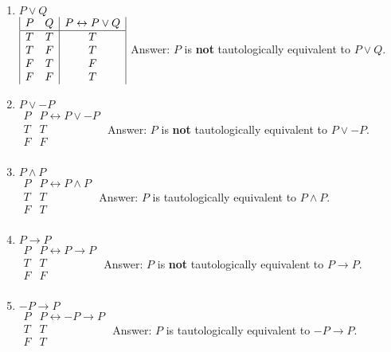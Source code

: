 \documentclass{article}
\begin{document}
\begin{enumerate}[label=(\alph*)]

\item \(P \lor Q\)\\
\(
\begin{array}{|c c|c|}
P & Q & P \leftrightarrow P \lor Q\\ 
\hline
T & T & T\\
T & F & T\\
F & T & F\\
F & F & T\\
\end{array}
\)
\singlespace
Answer: \(P\) is \textbf{not} tautologically equivalent to \(P \lor Q\).\\
\medskip

\item \(P \lor -P\)\\
\(
\begin{array}{|c|c|}
P & P \leftrightarrow P \lor -P\\ 
\hline
T & T\\
F & F\\
\end{array}
\)
\singlespace
Answer: \(P\) is \textbf{not} tautologically equivalent to \(P \lor -P\).\\
\medskip

\item \(P \land P\)\\
\(
\begin{array}{|c|c|}
P & P \leftrightarrow P \land P\\ 
\hline
T & T\\
F & T\\
\end{array}
\)
\singlespace
Answer: \(P\) is tautologically equivalent to \(P \land P\).\\
\medskip

\item \(P \rightarrow P\)\\
\(
\begin{array}{|c|c|}
P & P \leftrightarrow P \rightarrow P\\ 
\hline
T & T\\
F & F\\
\end{array}
\)
\singlespace
Answer: \(P\) is \textbf{not} tautologically equivalent to \(P \rightarrow P\).\\
\medskip

\item \(-P \rightarrow P\)\\
\(
\begin{array}{|c|c|}
P & P \leftrightarrow -P \rightarrow P\\ 
\hline
T & T\\
F & T\\
\end{array}
\)
\singlespace
Answer: \(P\) is  tautologically equivalent to \(-P \rightarrow P\).\\
\medskip


\end{enumerate}
\end{document}
